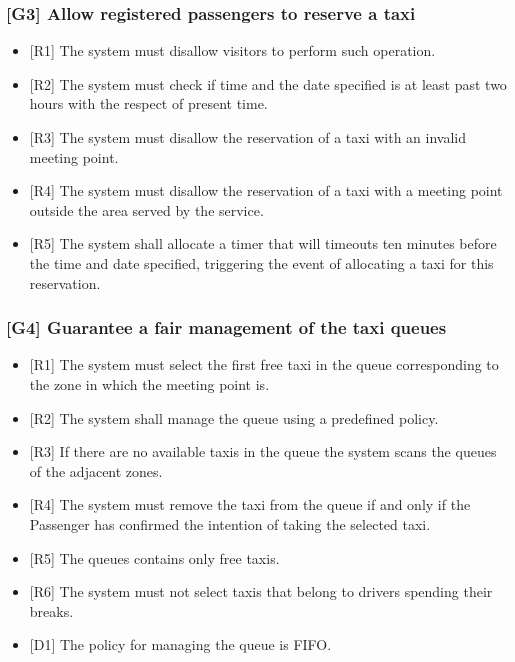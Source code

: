 \documentclass[a4paper,12pt]{article}%
\begin{document}
\subsubsection{{[}G3{]} Allow registered passengers to reserve a taxi}
\label{goal3}
\begin{itemize}
\item {[}R1{]} The system must disallow visitors to perform such operation.
\item {[}R2{]} The system must check if time and the date specified is at least past two hours with the respect of present time.
\item {[}R3{]} The system must disallow the reservation of a taxi with an invalid meeting point.
\item {[}R4{]} The system must disallow the reservation of a taxi with a meeting point outside the area served by the service.
\item {[}R5{]} The system shall allocate a timer that will timeouts ten minutes before the time and date specified, triggering the event of allocating a taxi for this reservation.
\end{itemize}
\subsubsection{{[}G4{]} Guarantee a fair management of the taxi queues}
\begin{itemize}
\item {[}R1{]} The system must select the first free taxi in the queue corresponding to the zone in which the meeting point is.
\item {[}R2{]} The system shall manage the queue using a predefined policy.
\item {[}R3{]} If there are no available taxis in the queue the system scans the queues of the adjacent zones.
\item {[}R4{]} The system must remove the taxi from the queue if and only if the Passenger has confirmed the intention of taking the selected taxi.
\item {[}R5{]} The queues contains only free taxis.
\item {[}R6{]} The system must not select taxis that belong to drivers spending their breaks.
\item {[}D1{]} The policy for managing the queue is FIFO.
\end{itemize}
\label{goal4}
\end{document}
